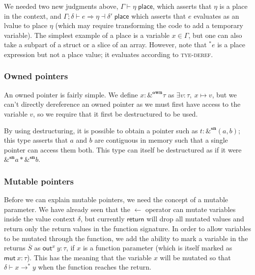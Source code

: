 \documentclass[acmsmall,nonacm]{acmart}
\newcommand*{\N}{\mathbb{N}}
\newcommand{\core}[1]{\left| #1 \right|}
\newcommand{\proves}{\vdash}
\newcommand{\makes}{\dashv}
\begin{document}
We needed two new judgments above, $\Gamma \proves \eta\;\mathsf{place}$, which asserts that $\eta$ is a place in the context, and $\Gamma;\delta \proves e\Rightarrow\eta\makes\delta'\;\mathsf{place}$ which asserts that $e$ evaluates as an lvalue to place $\eta$ (which may require transforming the code to add a temporary variable). The simplest example of a place is a variable $x\in\Gamma$, but one can also take a subpart of a struct or a slice of an array. However, note that ${}^*e$ is a place expression but not a place value; it evaluates according to \textsc{tye-deref}.

\subsubsection{Owned pointers}

An owned pointer is fairly simple. We define $\boxed{x:\&^\mathbf{own}\tau}$ as $\exists v:\tau,\ x\mapsto v$, but we can't directly dereference an owned pointer as we must first have access to the variable $v$, so we require that it first be destructured to be used.


By using destructuring, it is possible to obtain a pointer such as $t:\&^\mathbf{sn}(a,b)$; this type asserts that $a$ and $b$ are contiguous in memory such that a single pointer can access them both. This type can itself be destructured as if it were $\&^\mathbf{sn}a\ast \&^\mathbf{sn}b$.

\subsubsection{Mutable pointers}
Before we can explain mutable pointers, we need the concept of a mutable parameter. We have already seen that the $\gets$ operator can mutate variables inside the value context $\delta$, but currently $\mathsf{return}$ will drop all mutated values and return only the return values in the function signature. In order to allow variables to be mutated through the function, we add the ability to mark a variable in the returns $\overline{S}$ as $\mathsf{out}^x\ y:\tau$, if $x$ is a function parameter (which is itself marked as $\mathsf{mut}\ x:\tau$). This has the meaning that the variable $x$ will be mutated so that $\delta\proves x\to^* y$ when the function reaches the return.
\end{document}
